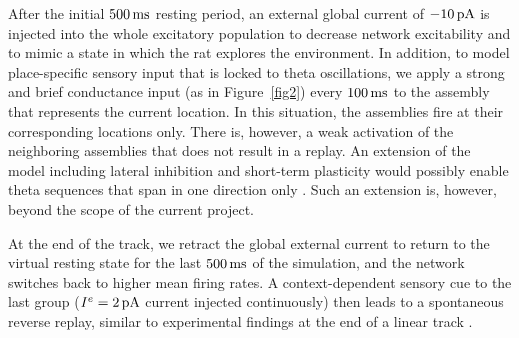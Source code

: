     After the initial $500 \, \rm ms$ resting period, an external global
    current of $-10 \, \rm pA$ is injected into the whole excitatory population
    to decrease network excitability and to mimic a state in which the rat
    explores the environment.  In addition, to model place-specific sensory
    input that is locked to theta oscillations, we apply a strong and brief
    conductance input (as in Figure~\ref{fig2}) every $100 \, \rm ms$ to the
    assembly that represents the current location. In this situation, the
    assemblies fire at their corresponding locations only. There is, however, a
    weak activation of the neighboring assemblies that does not result in a
    replay. An extension of the model including lateral inhibition and
    short-term plasticity would possibly enable theta sequences that span in
    one direction only \citep{Romani2015}. Such an extension is, however, beyond
    the scope of the current project.
        
    At the end of the track, we retract the global external current to return
    to the virtual resting state for the last $500 \, \rm ms$ of the
    simulation, and the network switches back to higher mean firing rates. A
    context-dependent sensory cue to the last group ($I^e=2 \, \rm pA$ current
    injected continuously) then leads to a spontaneous reverse replay, similar
    to experimental findings at the end of a linear track \citep{Foster2006,
    Diba2007}.

